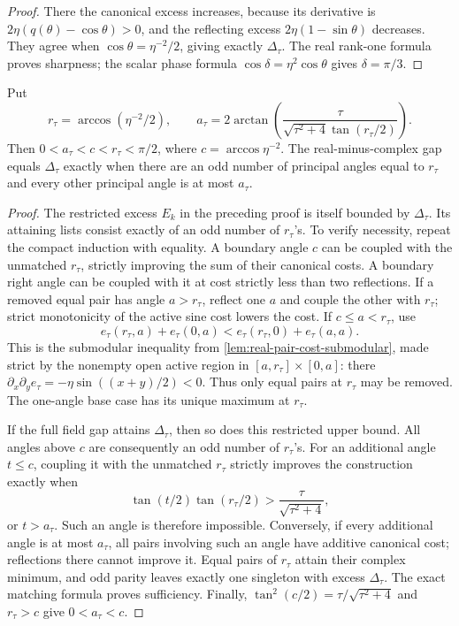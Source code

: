 \begin{proof}
There the canonical excess increases, because its derivative is
$2\eta(q(\theta)-\cos\theta)>0$, and the reflecting excess
$2\eta(1-\sin\theta)$ decreases. They agree when
$\cos\theta=\eta^{-2}/2$, giving exactly $\Delta_\tau$.
The real rank-one formula proves sharpness; the scalar phase formula
$\cos\delta=\eta^2\cos\theta$ gives $\delta=\pi/3$.
\end{proof}

\begin{corollary}
\label{cor:real-complex-smoothed-gap-equality}
Put
\[
 r_\tau=\arccos(\eta^{-2}/2),\qquad
 a_\tau=2\arctan\left(
   \frac{\tau}{\sqrt{\tau^2+4}\tan(r_\tau/2)}\right).
\]
Then $0<a_\tau<c<r_\tau<\pi/2$, where $c=\arccos\eta^{-2}$.
The real-minus-complex gap equals $\Delta_\tau$ exactly when there
are an odd number of principal angles equal to $r_\tau$ and every
other principal angle is at most $a_\tau$.
\end{corollary}

\begin{proof}
The restricted excess $E_k$ in the preceding proof is itself bounded by
$\Delta_\tau$. Its attaining lists consist exactly of an odd number
of $r_\tau$'s. To verify necessity, repeat the compact induction with
equality. A boundary angle $c$ can be coupled with the unmatched
$r_\tau$, strictly improving the sum of their canonical costs.
A boundary right angle can be coupled with it at cost strictly less
than two reflections. If a removed equal pair has angle $a>r_\tau$,
reflect one $a$ and couple the other with $r_\tau$; strict monotonicity
of the active sine cost lowers the cost. If $c\leq a<r_\tau$, use
\[
 e_\tau(r_\tau,a)+e_\tau(0,a)
   <e_\tau(r_\tau,0)+e_\tau(a,a).
\]
This is the submodular inequality from
\cref{lem:real-pair-cost-submodular}, made strict by the nonempty open
active region in $[a,r_\tau]\times[0,a]$: there
$\partial_x\partial_y e_\tau=-\eta\sin((x+y)/2)<0$.
Thus only equal pairs at $r_\tau$ may be removed. The one-angle
base case has its unique maximum at $r_\tau$.

If the full field gap attains $\Delta_\tau$, then so does this
restricted upper bound. All angles above $c$ are consequently an odd
number of $r_\tau$'s. For an additional angle $t\leq c$, coupling it
with the unmatched $r_\tau$ strictly improves the construction exactly
when
\[
 \tan(t/2)\tan(r_\tau/2)>\frac{\tau}{\sqrt{\tau^2+4}},
\]
or $t>a_\tau$. Such an angle is therefore impossible.
Conversely, if every additional angle is at most $a_\tau$, all pairs
involving such an angle have additive canonical cost; reflections there
cannot improve it. Equal pairs of $r_\tau$ attain their complex
minimum, and odd parity leaves exactly one singleton with excess
$\Delta_\tau$. The exact matching formula proves sufficiency.
Finally, $\tan^2(c/2)=\tau/\sqrt{\tau^2+4}$ and $r_\tau>c$
give $0<a_\tau<c$.
\end{proof}

